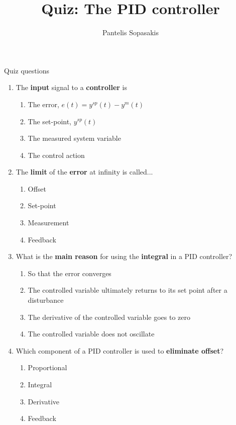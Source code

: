 \documentclass[a4paper,10pt,reqno]{amsart}
\title[PID Controller]{Quiz: The PID controller}
\author[P. Sopasakis]{Pantelis Sopasakis}
\numberwithin{equation}{section}
\theoremstyle{plain}
\begin{document}
\maketitle
Quiz questions
\textbf{}
\begin{enumerate} 
 
 \item The \textbf{input} signal to a \textbf{controller} is 
    \begin{enumerate}
     \item The error, $e(t) = y^{sp}(t) - y^{m}(t)$
     \item The set-point, $y^{sp}(t)$
     \item The measured system variable
     \item The control action
    \end{enumerate}

 \item The \textbf{limit} of the \textbf{error} at infinity is called...
    \begin{enumerate}
     \item Offset
     \item Set-point
     \item Measurement
     \item Feedback
    \end{enumerate}
    
 \item What is the \textbf{main reason} for using the \textbf{integral} in a PID controller?
  \begin{enumerate}
   \item So that the error converges
   \item The controlled variable ultimately returns to its set point after a disturbance 
   \item The derivative of the controlled variable goes to zero
   \item The controlled variable does not oscillate
  \end{enumerate}    
    
 \item Which component of a PID controller is used to \textbf{eliminate offset}?
  \begin{enumerate}
   \item Proportional
   \item Integral
   \item Derivative
   \item Feedback
  \end{enumerate}




\end{enumerate}
\end{document}
